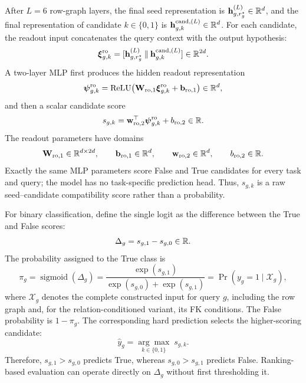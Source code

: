 After \(L=6\) row-graph layers, the final seed representation is
\(\mathbf h_{g,r_g^\star}^{(L)}\in\mathbb{R}^d\), and the final representation of
candidate \(k\in\{0,1\}\) is
\(\mathbf h_{g,k}^{\mathrm{cand},(L)}\in\mathbb{R}^d\). For each candidate, the
readout input concatenates the query context with the output hypothesis:
\begin{equation}
  \boldsymbol\xi_{g,k}^{\mathrm{ro}}
  =
  [
    \mathbf h_{g,r_g^\star}^{(L)}
    \mathbin{\Vert}
    \mathbf h_{g,k}^{\mathrm{cand},(L)}
  ]
  \in\mathbb{R}^{2d}.
\label{eq:method:readout-input}
\end{equation}
A two-layer MLP first produces the hidden readout representation
\begin{equation}
  \boldsymbol\psi_{g,k}^{\mathrm{ro}}
  =
  \operatorname{ReLU}\!\left(
    \mathbf W_{\mathrm{ro},1}
    \boldsymbol\xi_{g,k}^{\mathrm{ro}}
    +\mathbf b_{\mathrm{ro},1}
  \right)
  \in\mathbb{R}^d,
\label{eq:method:readout-hidden}
\end{equation}
and then a scalar candidate score
\begin{equation}
  s_{g,k}
  =
  \mathbf w_{\mathrm{ro},2}^{\top}
  \boldsymbol\psi_{g,k}^{\mathrm{ro}}
  +b_{\mathrm{ro},2}
  \in\mathbb{R}.
\label{eq:method:candidate-score}
\end{equation}
The readout parameters have domains
\begin{equation}
  \mathbf W_{\mathrm{ro},1}\in\mathbb{R}^{d\times2d},
  \qquad
  \mathbf b_{\mathrm{ro},1}\in\mathbb{R}^d,
  \qquad
  \mathbf w_{\mathrm{ro},2}\in\mathbb{R}^d,
  \qquad
  b_{\mathrm{ro},2}\in\mathbb{R}.
\label{eq:method:readout-parameter-domains}
\end{equation}
Exactly the same MLP parameters score False and True candidates for every
task and query; the model has no task-specific prediction head. Thus,
\(s_{g,k}\) is a raw seed--candidate compatibility score rather than a
probability.

For binary classification, define the single logit as the difference
between the True and False scores:
\begin{equation}
  \Delta_g
  =
  s_{g,1}-s_{g,0}
  \in\mathbb{R}.
\label{eq:method:classification-logit}
\end{equation}
The probability assigned to the True class is
\begin{equation}
  \pi_g
  =
  \operatorname{sigmoid}(\Delta_g)
  =
  \frac{\exp(s_{g,1})}{\exp(s_{g,0})+\exp(s_{g,1})}
  =
  \Pr(y_g=1\mid\mathcal X_g),
\label{eq:method:classification-probability}
\end{equation}
where \(\mathcal X_g\) denotes the complete constructed input for query
\(g\), including the row graph and, for the relation-conditioned variant,
its FK conditions. The False probability is \(1-\pi_g\). The corresponding
hard prediction selects the higher-scoring candidate:
\begin{equation}
  \widehat y_g
  =
  \underset{k\in\{0,1\}}{\arg\max}\;s_{g,k}.
\label{eq:method:classification-prediction}
\end{equation}
Therefore, \(s_{g,1}>s_{g,0}\) predicts True, whereas
\(s_{g,0}>s_{g,1}\) predicts False. Ranking-based evaluation can operate
directly on \(\Delta_g\) without first thresholding it.

